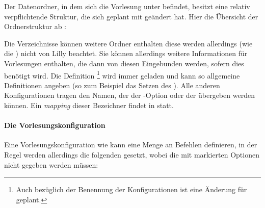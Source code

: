 Der Datenordner, in dem sich die Vorlesung unter  befindet, besitzt eine relativ verpflichtende Struktur, die sich geplant mit  geändert hat. Hier die Übersicht der Ordnerstruktur ab :\par
\begin{minipage}{0.65\linewidth}Die Verzeichnisse können weitere Ordner enthalten diese werden allerdings (wie die ) nicht von Lilly beachtet. Sie können allerdings weitere Informationen für Vorlesungen enthalten, die dann von diesen Eingebunden werden, sofern dies benötigt wird. Die Definition \footnote{Auch bezüglich der Benennung der Konfigurationen ist eine Änderung für  geplant.} wird immer geladen und kann so allgemeine Definitionen angeben (so zum Beispiel das Setzen des ). Alle anderen Konfigurationen tragen den Namen, der der -Option  oder der \Jake[-]  übergeben werden können. Ein \emph{mapping} dieser Bezeichner findet in  statt.

\paragraph{Die Vorlesungskonfiguration}
Eine Vorlesungskonfiguration wie  kann eine Menge an Befehlen definieren, in der Regel werden allerdings die folgenden gesetzt, wobei die mit  markierten Optionen nicht gegeben werden müssen:
\end{minipage}\begin{minipage}{0.35\linewidth}
    \centering{}
\end{minipage}
